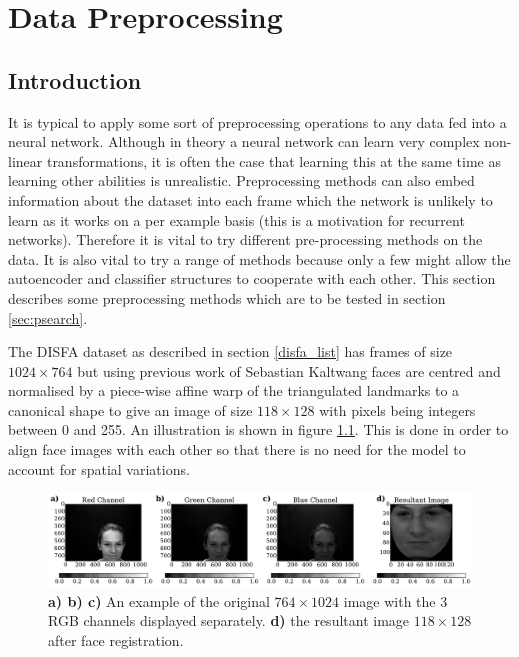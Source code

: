 \chapter{Data Preprocessing}
  \section{Introduction}
    It is typical to apply some sort of preprocessing operations to any data fed into
    a neural network. Although in theory a neural network can learn very complex
    non-linear transformations, it is often the case that learning this at the same
    time as learning other abilities is unrealistic. Preprocessing methods can
    also embed information about the dataset into each frame which the network is
    unlikely to learn as it works on a per example basis (this is a motivation for
    recurrent networks).
     Therefore it is vital to try
    different pre-processing methods on the data.
    It is also vital to try a range of methods
    because only a few
    might allow the autoencoder and classifier structures to cooperate with each other.
    This section describes some preprocessing methods which are to be
    tested in section \ref{sec:psearch}.


    The DISFA dataset as described in section \ref{disfa_list} has frames of size $ 1024 \times 764 $
    but using previous work of Sebastian Kaltwang\cite{Kaltwang2015} faces are
    centred and normalised by a piece-wise affine warp of the triangulated
    landmarks to a canonical shape to give an image of size $118 \times 128$
    with pixels being integers between
    0 and 255. An illustration is shown in figure \ref{fig:sebproc}.
    This is done in order to align face images with each other so that
    there is no need for the model to account for spatial variations.

    \begin{figure}[!h] \centering
    \includegraphics[width =\hsize]{figures/seb_preproc.pdf}
    \caption{ {\bf a) b) c)} An example of the original $764 \times 1024$ image with
    the 3 RGB channels displayed separately. {\bf d)} the resultant image
    $118 \times 128$ after face registration.} \label{fig:sebproc} \end{figure}


